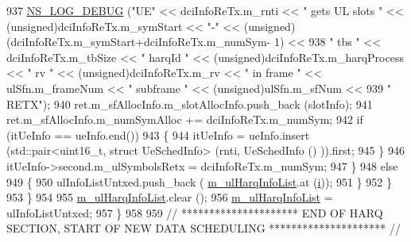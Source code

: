 \begin{DoxyCode}
937                                         \hyperlink{group__logging_ga413f1886406d49f59a6a0a89b77b4d0a}{NS\_LOG\_DEBUG} (\textcolor{stringliteral}{"UE"} << dciInfoReTx.m\_rnti << \textcolor{stringliteral}{" gets UL
       slots "} << (\textcolor{keywordtype}{unsigned})dciInfoReTx.m\_symStart << \textcolor{stringliteral}{"-"} << (\textcolor{keywordtype}{unsigned})(dciInfoReTx.m\_symStart+dciInfoReTx.m\_numSym-
      1) <<
938                                                                                          \textcolor{stringliteral}{" tbs "} << 
      dciInfoReTx.m\_tbSize << \textcolor{stringliteral}{" harqId "} << (\textcolor{keywordtype}{unsigned})dciInfoReTx.m\_harqProcess << \textcolor{stringliteral}{" rv "} << (\textcolor{keywordtype}{unsigned})dciInfoReTx.m\_rv 
      << \textcolor{stringliteral}{" in frame "} << ulSfn.m\_frameNum << \textcolor{stringliteral}{" subframe "} << (\textcolor{keywordtype}{unsigned})ulSfn.m\_sfNum <<
939                                                                                          \textcolor{stringliteral}{" RETX"});
940                                         ret.m\_sfAllocInfo.m\_slotAllocInfo.push\_back (slotInfo);
941                                         ret.m\_sfAllocInfo.m\_numSymAlloc += dciInfoReTx.m\_numSym;
942                                         \textcolor{keywordflow}{if} (itUeInfo == ueInfo.end())
943                                         \{
944                                                 itUeInfo = ueInfo.insert (std::pair<uint16\_t, struct
       UeSchedInfo> (rnti, UeSchedInfo () )).first;
945                                         \}
946                                         itUeInfo->second.m\_ulSymbolsRetx = dciInfoReTx.m\_numSym;
947                                 \}
948                                 \textcolor{keywordflow}{else}
949                                 \{
950                                         ulInfoListUntxed.push\_back (
      \hyperlink{classns3_1_1MmWaveFlexTtiMacScheduler_ae98000612167824fd24cdca1f812bc60}{m\_ulHarqInfoList}.at (\hyperlink{bernuolliDistribution_8m_a6f6ccfcf58b31cb6412107d9d5281426}{i}));
951                                 \}
952                         \}
953                 \}
954 
955                 \hyperlink{classns3_1_1MmWaveFlexTtiMacScheduler_ae98000612167824fd24cdca1f812bc60}{m\_ulHarqInfoList}.clear ();
956                 \hyperlink{classns3_1_1MmWaveFlexTtiMacScheduler_ae98000612167824fd24cdca1f812bc60}{m\_ulHarqInfoList} = ulInfoListUntxed;
957         \}
958 
959         \textcolor{comment}{// ********************* END OF HARQ SECTION, START OF NEW DATA SCHEDULING ********************* //}

\end{DoxyCode}
